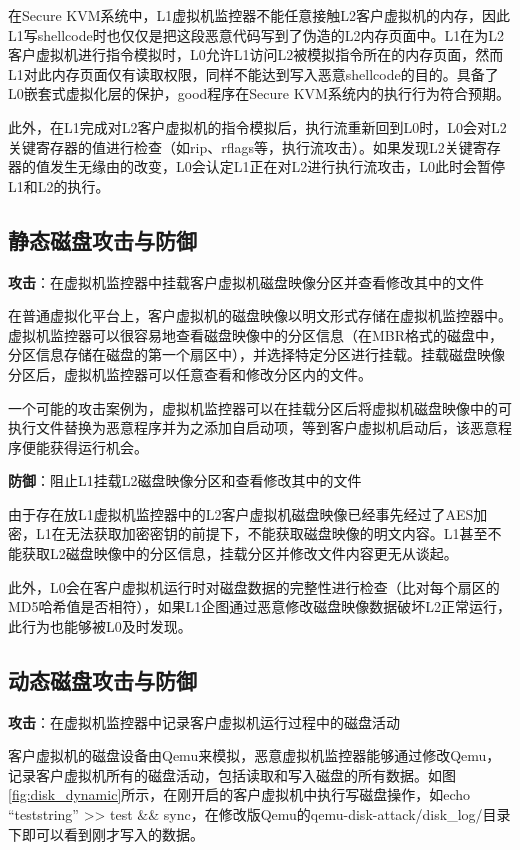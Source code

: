在Secure KVM系统中，L1虚拟机监控器不能任意接触L2客户虚拟机的内存，因此L1写shellcode时也仅仅是把这段恶意代码写到了伪造的L2内存页面中。L1在为L2客户虚拟机进行指令模拟时，L0允许L1访问L2被模拟指令所在的内存页面，然而L1对此内存页面仅有读取权限，同样不能达到写入恶意shellcode的目的。具备了L0嵌套式虚拟化层的保护，good程序在Secure KVM系统内的执行行为符合预期。

此外，在L1完成对L2客户虚拟机的指令模拟后，执行流重新回到L0时，L0会对L2关键寄存器的值进行检查（如rip、rflags等，执行流攻击）。如果发现L2关键寄存器的值发生无缘由的改变，L0会认定L1正在对L2进行执行流攻击，L0此时会暂停L1和L2的执行。

\subsection{静态磁盘攻击与防御}

\noindent
\textbf{攻击\uppercase\expandafter{}}：在虚拟机监控器中挂载客户虚拟机磁盘映像分区并查看修改其中的文件

在普通虚拟化平台上，客户虚拟机的磁盘映像以明文形式存储在虚拟机监控器中。虚拟机监控器可以很容易地查看磁盘映像中的分区信息（在MBR格式的磁盘中，分区信息存储在磁盘的第一个扇区中），并选择特定分区进行挂载。挂载磁盘映像分区后，虚拟机监控器可以任意查看和修改分区内的文件。

一个可能的攻击案例为，虚拟机监控器可以在挂载分区后将虚拟机磁盘映像中的可执行文件替换为恶意程序并为之添加自启动项，等到客户虚拟机启动后，该恶意程序便能获得运行机会。

\noindent
\textbf{防御\uppercase\expandafter{}}：阻止L1挂载L2磁盘映像分区和查看修改其中的文件

由于存在放L1虚拟机监控器中的L2客户虚拟机磁盘映像已经事先经过了AES加密，L1在无法获取加密密钥的前提下，不能获取磁盘映像的明文内容。L1甚至不能获取L2磁盘映像中的分区信息，挂载分区并修改文件内容更无从谈起。

此外，L0会在客户虚拟机运行时对磁盘数据的完整性进行检查（比对每个扇区的MD5哈希值是否相符），如果L1企图通过恶意修改磁盘映像数据破坏L2正常运行，此行为也能够被L0及时发现。

\subsection{动态磁盘攻击与防御}

\noindent
\textbf{攻击\uppercase\expandafter{}}：在虚拟机监控器中记录客户虚拟机运行过程中的磁盘活动

客户虚拟机的磁盘设备由Qemu来模拟，恶意虚拟机监控器能够通过修改Qemu，记录客户虚拟机所有的磁盘活动，包括读取和写入磁盘的所有数据。如图\ref{fig:disk_dynamic}所示，在刚开启的客户虚拟机中执行写磁盘操作，如echo ``teststring'' >> test \&\& sync，在修改版Qemu的qemu-disk-attack/disk\_log/目录下即可以看到刚才写入的数据。

